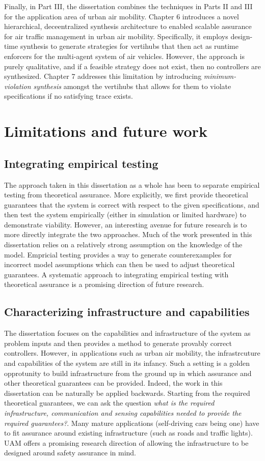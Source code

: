 Finally, in Part III, the dissertation combines the techniques in Parts II and III for the application area of urban air mobility. Chapter 6 introduces a novel hierarchical, deceentralized synthesis architecture to enabled scalable assurance for air traffic management in urban air mobility. Specifically, it employs design-time synthesis to generate strategies for vertihubs that then act as runtime enforcers for the multi-agent system of air vehicles. However, the approach is purely qualitative, and if a feasible strategy does not exist, then no controllers are synthesized. Chapter 7 addresses this limitation by introducing \emph{minimum-violation synthesis} amongst the vertihubs that allows for them to violate specifications if no satisfying trace exists. 

\section{Limitations and future work}

\subsection{Integrating empirical testing}
The approach taken in this dissertation as a whole has been to separate empirical testing from theoretical assurance. More explicitly, we first provide theoretical guarantees that the system is correct with respect to the given specifications, and then test the system empirically (either in simulation or limited hardware) to demonstrate viability. However, an interesting avenue for future research is to more directly integrate the two approaches. Much of the work presented in this dissertation relies on a relatively strong assumption on the knowledge of the model. Empricial testing provides a way to generate counterexamples for incorrect model assumptions which can then be used to adjust theoretical guarantees. A systematic approach to integrating empirical testing with theoretical assurance is a promising direction of future research. 

\subsection{Characterizing infrastructure and capabilities}
The dissertation focuses on the capabilities and infrastructure of the system as problem inputs and then provides a method to generate provably correct controllers. However, in applications such as urban air mobility, the infrastrcuture and capabilities of the system are still in its infancy. Such a setting is a golden opprotunity to build infrastructure from the ground up in which assurance and other theoretical guarantees can be provided. Indeed, the work in this dissertation can be naturally be applied backwards. Starting from the required theoretical guarantees, we can ask the question \emph{what is the required infrastructure, communication and sensing capabilities needed to provide the required guarantees?}. Many mature applications (self-driving cars being one) have to fit assurance around existing infrastructure (such as roads and traffic lights). UAM offers a promising research direction of allowing the infrastructure to be designed around safety assurance in mind. 